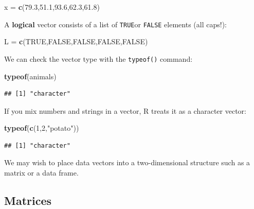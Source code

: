 \documentclass[
]{book}
\newenvironment{Shaded}{\begin{snugshade}}{\end{snugshade}}
\newcommand{\ConstantTok}[1]{\textcolor[rgb]{0.56,0.35,0.01}{#1}}
\newcommand{\DecValTok}[1]{\textcolor[rgb]{0.00,0.00,0.81}{#1}}
\newcommand{\FloatTok}[1]{\textcolor[rgb]{0.00,0.00,0.81}{#1}}
\newcommand{\FunctionTok}[1]{\textcolor[rgb]{0.13,0.29,0.53}{\textbf{#1}}}
\newcommand{\NormalTok}[1]{#1}
\newcommand{\OtherTok}[1]{\textcolor[rgb]{0.56,0.35,0.01}{#1}}
\newcommand{\StringTok}[1]{\textcolor[rgb]{0.31,0.60,0.02}{#1}}
\theoremstyle{definition}
\theoremstyle{definition}
\theoremstyle{definition}
\theoremstyle{definition}
\theoremstyle{remark}
\begin{document}
\begin{Shaded}
\begin{Highlighting}[]
\NormalTok{x }\OtherTok{=} \FunctionTok{c}\NormalTok{(}\FloatTok{79.3}\NormalTok{,}\FloatTok{51.1}\NormalTok{,}\FloatTok{93.6}\NormalTok{,}\FloatTok{62.3}\NormalTok{,}\FloatTok{61.8}\NormalTok{)}
\end{Highlighting}
\end{Shaded}

A \textbf{logical} vector consists of a list of \texttt{TRUE}or \texttt{FALSE} elements (all caps!):

\begin{Shaded}
\begin{Highlighting}[]
\NormalTok{L }\OtherTok{=} \FunctionTok{c}\NormalTok{(}\ConstantTok{TRUE}\NormalTok{,}\ConstantTok{FALSE}\NormalTok{,}\ConstantTok{FALSE}\NormalTok{,}\ConstantTok{FALSE}\NormalTok{,}\ConstantTok{FALSE}\NormalTok{)}
\end{Highlighting}
\end{Shaded}

We can check the vector type with the \texttt{typeof()} command:

\begin{Shaded}
\begin{Highlighting}[]
\FunctionTok{typeof}\NormalTok{(animals)}
\end{Highlighting}
\end{Shaded}

\begin{verbatim}
## [1] "character"
\end{verbatim}

If you mix numbers and strings in a vector, R treats it as a character vector:

\begin{Shaded}
\begin{Highlighting}[]
\FunctionTok{typeof}\NormalTok{(}\FunctionTok{c}\NormalTok{(}\DecValTok{1}\NormalTok{,}\DecValTok{2}\NormalTok{,}\StringTok{"potato"}\NormalTok{))}
\end{Highlighting}
\end{Shaded}

\begin{verbatim}
## [1] "character"
\end{verbatim}

We may wish to place data vectors into a two-dimensional structure such as a matrix or a data frame.

\subsection{Matrices}\label{matrices}
\end{document}

